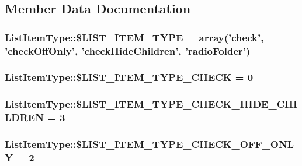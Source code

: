 \subsection{Member Data Documentation}
\hypertarget{classListItemType_abb10f2bfa4ee03a59aec27d6ea083a29}{
\subsubsection[{\$LIST\_\-ITEM\_\-TYPE}]{\setlength{\rightskip}{0pt plus 5cm}ListItemType::\$LIST\_\-ITEM\_\-TYPE = array('check', 'checkOffOnly', 'checkHideChildren', 'radioFolder')}}
\label{d7/d1b/classListItemType_abb10f2bfa4ee03a59aec27d6ea083a29}
\hypertarget{classListItemType_a1a80aa8e0e1267039bbb82ede39d3bf3}{
\subsubsection[{\$LIST\_\-ITEM\_\-TYPE\_\-CHECK}]{\setlength{\rightskip}{0pt plus 5cm}ListItemType::\$LIST\_\-ITEM\_\-TYPE\_\-CHECK = 0}}
\label{d7/d1b/classListItemType_a1a80aa8e0e1267039bbb82ede39d3bf3}
\hypertarget{classListItemType_a83b0cb3e54de0a470d476626a505e2d0}{
\subsubsection[{\$LIST\_\-ITEM\_\-TYPE\_\-CHECK\_\-HIDE\_\-CHILDREN}]{\setlength{\rightskip}{0pt plus 5cm}ListItemType::\$LIST\_\-ITEM\_\-TYPE\_\-CHECK\_\-HIDE\_\-CHILDREN = 3}}
\label{d7/d1b/classListItemType_a83b0cb3e54de0a470d476626a505e2d0}
\hypertarget{classListItemType_ae84a78642e9a6f748cd8026406295eb1}{
\subsubsection[{\$LIST\_\-ITEM\_\-TYPE\_\-CHECK\_\-OFF\_\-ONLY}]{\setlength{\rightskip}{0pt plus 5cm}ListItemType::\$LIST\_\-ITEM\_\-TYPE\_\-CHECK\_\-OFF\_\-ONLY = 2}}
